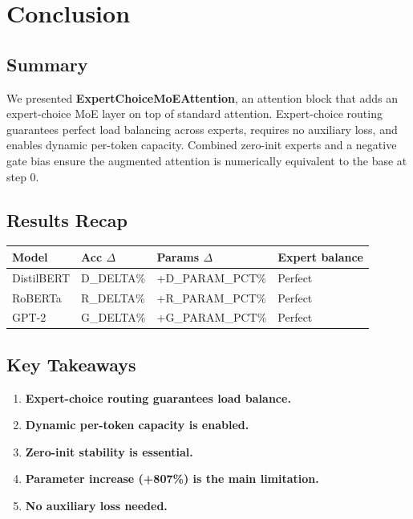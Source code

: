 \section{Conclusion}

\subsection{Summary}

We presented \textbf{ExpertChoiceMoEAttention}, an attention block that adds an 
expert-choice MoE layer on top of standard attention. Expert-choice routing 
guarantees perfect load balancing across experts, requires no auxiliary 
loss, and enables dynamic per-token capacity. Combined zero-init experts 
and a negative gate bias ensure the augmented attention is numerically 
equivalent to the base at step 0.

\subsection{Results Recap}

\begin{table}[H]
\centering
\small
\begin{tabular}{llll}
\toprule
\textbf{Model} & \textbf{Acc $\Delta$} & \textbf{Params $\Delta$} & \textbf{Expert balance} \\
\midrule
DistilBERT & {{D\_DELTA}}\% & +{{D\_PARAM\_PCT}}\% & Perfect \\
RoBERTa & {{R\_DELTA}}\% & +{{R\_PARAM\_PCT}}\% & Perfect \\
GPT-2 & {{G\_DELTA}}\% & +{{G\_PARAM\_PCT}}\% & Perfect \\
\bottomrule
\end{tabular}
\end{table}

\subsection{Key Takeaways}

\begin{enumerate}
\item \textbf{Expert-choice routing guarantees load balance.}
\item \textbf{Dynamic per-token capacity is enabled.}
\item \textbf{Zero-init stability is essential.}
\item \textbf{Parameter increase (+807\%) is the main limitation.}
\item \textbf{No auxiliary loss needed.}

\end{enumerate}
